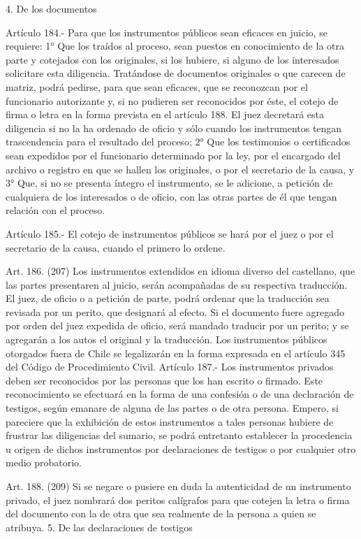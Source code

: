     4. De los documentos

    Artículo 184.- Para que los instrumentos públicos sean eficaces en juicio, se requiere:
    1° Que los traídos al proceso, sean puestos en conocimiento de la otra parte y cotejados con los originales, si los hubiere, si alguno de los interesados solicitare esta diligencia.
    Tratándose de documentos originales o que carecen de matriz, podrá pedirse, para que sean eficaces, que se reconozcan por el funcionario autorizante y, si no pudieren ser reconocidos por éste, el cotejo de firma o letra en la forma prevista en el artículo 188. El juez decretará esta diligencia si no la ha ordenado de oficio y sólo cuando los instrumentos tengan trascendencia para el resultado del proceso;
    2° Que los testimonios o certificados sean expedidos por el funcionario determinado por la ley, por el encargado del archivo o registro en que se hallen los originales, o por el secretario de la causa, y
    3° Que, si no se presenta íntegro el instrumento, se le adicione, a petición de cualquiera de los interesados o de oficio, con las otras partes de él que tengan relación con el proceso.

    Artículo 185.- El cotejo de instrumentos públicos se hará por el juez o por el secretario de la causa, cuando el primero lo ordene.


    Art. 186. (207) Los instrumentos extendidos en idioma diverso del castellano, que las partes presentaren al juicio, serán acompañadas de su respectiva traducción.
    El juez, de oficio o a petición de parte, podrá ordenar que la traducción sea revisada por un perito, que designará al efecto.
    Si el documento fuere agregado por orden del juez expedida de oficio, será mandado traducir por un perito; y se agregarán a los autos el original y la traducción.
    Los instrumentos públicos otorgados fuera de Chile se legalizarán en la forma expresada en el artículo 345 del Código de Procedimiento Civil.
    Artículo 187.- Los instrumentos privados deben ser reconocidos por las personas que los han escrito o firmado. Este reconocimiento se efectuará en la forma de una confesión o de una declaración de testigos, según emanare de alguna de las partes o de otra persona.
    Empero, si pareciere que la exhibición de estos instrumentos a tales personas hubiere de frustrar las diligencias del sumario, se podrá entretanto establecer la procedencia u origen de dichos instrumentos por declaraciones de testigos o por cualquier otro medio probatorio.

    Art. 188. (209) Si se negare o pusiere en duda la autenticidad de un instrumento privado, el juez nombrará dos peritos calígrafos para que cotejen la letra o firma del documento con la de otra que sea realmente de la persona a quien se atribuya.
  5. De las declaraciones de testigos

